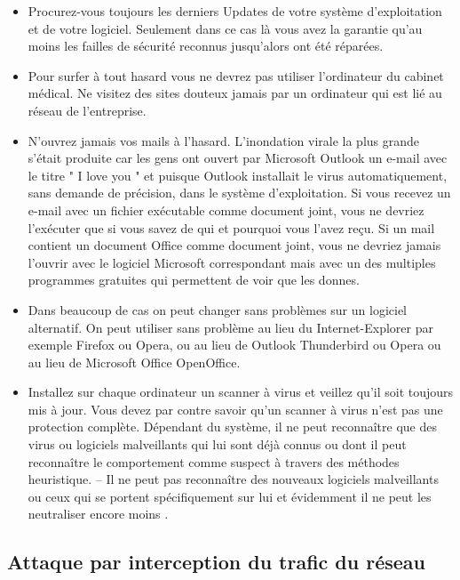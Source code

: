 \begin{itemize}
    \item{ Procurez-vous toujours les derniers Updates de votre système d'exploitation et de votre logiciel. Seulement dans ce cas là vous avez la garantie qu'au moins les failles de sécurité reconnus jusqu'alors ont été réparées. }
    \item{Pour surfer à tout hasard vous ne devrez pas utiliser l'ordinateur du cabinet médical. Ne visitez des sites douteux jamais par un ordinateur qui est lié au réseau de l'entreprise.}
    \item{N'ouvrez jamais vos mails à l'hasard. L'inondation virale la plus grande s'était produite car les gens ont ouvert par Microsoft Outlook un e-mail avec le titre " I love you " et puisque Outlook installait le virus automatiquement, sans demande de précision, dans le système d'exploitation. Si vous recevez un e-mail avec un fichier exécutable comme document joint, vous ne devriez l'exécuter que si vous savez de qui et pourquoi vous l'avez reçu. Si un mail contient un document Office comme document joint, vous ne devriez jamais l'ouvrir avec le logiciel Microsoft correspondant mais avec un des multiples programmes gratuites qui permettent de voir que les donnes. }
    \item{Dans beaucoup de cas on peut changer sans problèmes sur un logiciel alternatif. On peut utiliser sans problème au lieu du Internet-Explorer par exemple Firefox ou Opera, ou au lieu de Outlook Thunderbird ou Opera ou au lieu de Microsoft Office OpenOffice.}
    \item{Installez sur chaque ordinateur un scanner à virus et veillez qu'il soit toujours mis à jour. Vous devez par contre savoir qu'un scanner à virus n'est pas une protection complète. Dépendant du système, il ne peut reconnaître que des virus ou logiciels malveillants qui lui sont déjà connus ou dont il peut reconnaître le comportement comme suspect à travers des méthodes heuristique.  -- Il ne peut pas reconnaître des nouveaux logiciels malveillants ou ceux qui se portent spécifiquement sur lui et évidemment il ne peut les neutraliser encore moins
    .}

\end{itemize}

\subsection{Attaque par interception du trafic du réseau}

